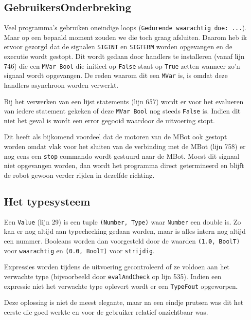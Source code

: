 \documentclass[11pt]{article}
\begin{document}
\subsection{GebruikersOnderbreking}
Veel programma's gebruiken oneindige loops (\texttt{Gedurende waarachtig doe: ...}). Maar op een bepaald moment zouden we die toch graag afsluiten. Daarom heb ik ervoor gezorgd dat de signalen \texttt{SIGINT} en \texttt{SIGTERM} worden opgevangen en de executie wordt gestopt. Dit wordt gedaan door handlers te installeren (vanaf lijn 746) die een \texttt{MVar Bool} die initieel op \texttt{False} staat op \texttt{True} zetten wanneer zo'n signaal wordt opgevangen. De reden waarom dit een \texttt{MVar} is, is omdat deze handlers asynchroon worden verwerkt.

Bij het verwerken van een lijst statements (lijn 657) wordt er voor het evalueren van iedere statement gekeken of deze \texttt{MVar Bool} nog steeds \texttt{False} is. Indien dit niet het geval is wordt een error gegooid waardoor de uitvoering stopt.

Dit heeft als bijkomend voordeel dat de motoren van de MBot ook gestopt worden omdat vlak voor het sluiten van de verbinding met de MBot (lijn 758) er nog eens een \texttt{stop} commando wordt gestuurd naar de MBot. Moest dit signaal niet opgevangen worden, dan wordt het programma direct getermineerd en blijft de robot gewoon verder rijden in dezelfde richting.

\subsection{Het typesysteem}
Een \texttt{Value} (lijn 29) is een tuple \texttt{(Number, Type)} waar \texttt{Number} een double is. Zo kan er nog altijd aan typechecking gedaan worden, maar is alles intern nog altijd een nummer. Booleans worden dan voorgesteld door de waarden \texttt{(1.0, BoolT)} voor \texttt{waarachtig} en \texttt{(0.0, BoolT)} voor \texttt{strijdig}.

Expressies worden tijdens de uitvoering gecontroleerd of ze voldoen aan het verwachte type (bijvoorbeeld door \texttt{evalAndCheck} op lijn 535). Indien een expressie niet het verwachte type oplevert wordt er een \texttt{TypeFout} opgeworpen.

Deze oplossing is niet de meest elegante, maar na een eindje prutsen was dit het eerste die goed werkte en voor de gebruiker relatief onzichtbaar was.
\end{document}
